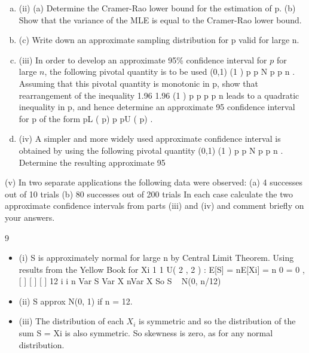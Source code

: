 \documentclass[a4paper,12pt]{article}
\begin{document}
\begin{enumerate}
\begin{enumerate}[(a)]
    \item (ii) (a) Determine the Cramer-Rao lower bound for the estimation of p.
(b) Show that the variance of the MLE is equal to the Cramer-Rao lower
bound.
    \item (c) Write down an approximate sampling distribution for p valid for
large n.
    \item (iii) In order to develop an approximate 95\% confidence interval for $p$ for large $n$,
the following pivotal quantity is to be used
(0,1)
(1 )
p p
N
p p
n
.
Assuming that this pivotal quantity is monotonic in p, show that rearrangement
of the inequality
1.96 1.96
(1 )
p p
p p
n
leads to a quadratic inequality in p, and hence determine an approximate 95%
confidence interval for p of the form pL ( p) p pU ( p) .

    \item (iv) A simpler and more widely used approximate confidence interval is obtained
by using the following pivotal quantity
(0,1)
(1 )
p p
N
p p
n
.
Determine the resulting approximate 95%
\end{enumerate}


(v) In two separate applications the following data were observed:
(a) 4 successes out of 10 trials
(b) 80 successes out of 200 trials
In each case calculate the two approximate confidence intervals from parts
(iii) and (iv) and comment briefly on your answers.
\end{enumerate}
\newpage
9 
\begin{itemize}
    \item (i) S is approximately normal for large n by Central Limit Theorem.
Using results from the Yellow Book for Xi
1 1
U( 2 , 2 ) :
E[S] = nE[Xi] = n 0 = 0 , [ ] [ ] [ ]
12 i i
n
Var S Var X nVar X
So S ~ N(0, n/12)
\item (ii) S approx N(0, 1) if n = 12.
\item (iii) The distribution of each $X_i$ is symmetric and so the distribution of the sum
S = Xi is also symmetric. So skewness is zero, as for any normal distribution.
\end{itemize}

\end{document}
